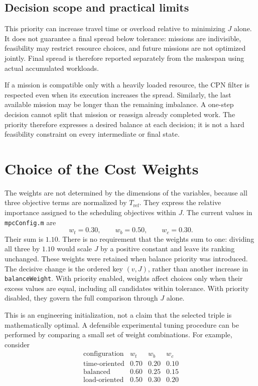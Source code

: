 \subsection{Decision scope and practical limits}

This priority can increase travel time or overload relative to minimizing
$J$ alone. It does not guarantee a final spread below tolerance: missions
are indivisible, feasibility may restrict resource choices, and future
missions are not optimized jointly. Final spread is therefore reported
separately from the makespan using actual accumulated workloads.

If a mission is compatible only with a heavily loaded resource, the CPN
filter is respected even when its execution increases the spread. Similarly,
the last available mission may be longer than the remaining imbalance. A
one-step decision cannot split that mission or reassign already completed
work. The priority therefore expresses a desired balance at each decision;
it is not a hard feasibility constraint on every intermediate or final state.

\section{Choice of the Cost Weights}

The weights are not determined by the dimensions of the variables, because
all three objective terms are normalized by $T_{\mathrm{ref}}$. They express
the relative importance assigned to the scheduling objectives within $J$.
The current values in \texttt{mpcConfig.m} are
\begin{equation}
	w_t=0.30,\qquad w_b=0.50,\qquad w_c=0.30.
\end{equation}
Their sum is $1.10$. There is no requirement that the weights sum to one:
dividing all three by $1.10$ would scale $J$ by a positive constant and leave
its ranking unchanged. These weights were retained when balance priority
was introduced. The decisive change is the ordered key $(v,J)$, rather than
another increase in \texttt{balanceWeight}. With priority enabled, weights
affect choices only when their excess values are equal, including all
candidates within tolerance. With priority disabled, they govern the full
comparison through $J$ alone.

This is an engineering initialization, not a claim that the selected triple
is mathematically optimal. A defensible experimental tuning procedure can be
performed by comparing a small set of weight combinations. For example,
consider
\begin{equation}
	\begin{array}{c|ccc}
		\text{configuration} & w_t & w_b & w_c\\
		\hline
		\text{time-oriented} & 0.70 & 0.20 & 0.10\\
		\text{balanced} & 0.60 & 0.25 & 0.15\\
		\text{load-oriented} & 0.50 & 0.30 & 0.20
	\end{array}
\end{equation}

